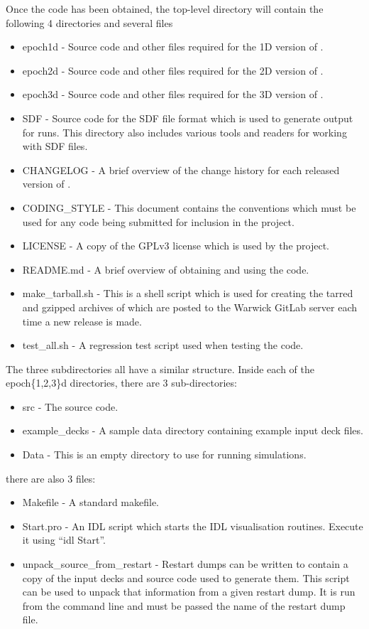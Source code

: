 Once the code has been obtained, the top-level directory will contain the
following 4 directories and several files
\begin{itemize}
\item epoch1d - Source code and other files required for the 1D version of
  {\EPOCH}.
\item epoch2d - Source code and other files required for the 2D version of
  {\EPOCH}.
\item epoch3d - Source code and other files required for the 3D version of
  {\EPOCH}.
\item SDF - Source code for the SDF file format which is used to generate
  output for {\EPOCH} runs. This directory also includes various tools
  and readers for working with SDF files.
\item CHANGELOG - A brief overview of the change history for each
  released version of {\EPOCH}.
\item CODING\_STYLE - This document contains the conventions which must be
  used for any code being submitted for inclusion in the {\EPOCH} project.
\item LICENSE - A copy of the GPLv3 license which is used by the {\EPOCH}
  project.
\item README.md - A brief overview of obtaining and using the {\EPOCH} code.
\item make\_tarball.sh - This is a shell script which is used for creating
  the tarred and gzipped archives of {\EPOCH} which are posted to the Warwick
  GitLab server each time a new release is made.
\item test\_all.sh - A regression test script used when testing the code.
\end{itemize}

The three {\EPOCH} subdirectories all have a similar structure. Inside each
of the epoch\{1,2,3\}d directories, there are 3 sub-directories:

\begin{itemize}
\item src - The {\EPOCH} source code.
\item example\_decks - A sample data directory containing example input deck
  files.
\item Data - This is an empty directory to use for running simulations.
\end{itemize}

there are also 3 files:

\begin{itemize}
\item Makefile - A standard makefile.
\item Start.pro - An IDL script which starts the IDL visualisation
  routines. Execute it using ``idl Start''.
\item unpack\_source\_from\_restart - Restart dumps can be written to contain
  a copy of the input decks and source code used to generate them. This script
  can be used to unpack that information from a given restart dump. It is run
  from the command line and must be passed the name of the restart dump file.
\end{itemize}


